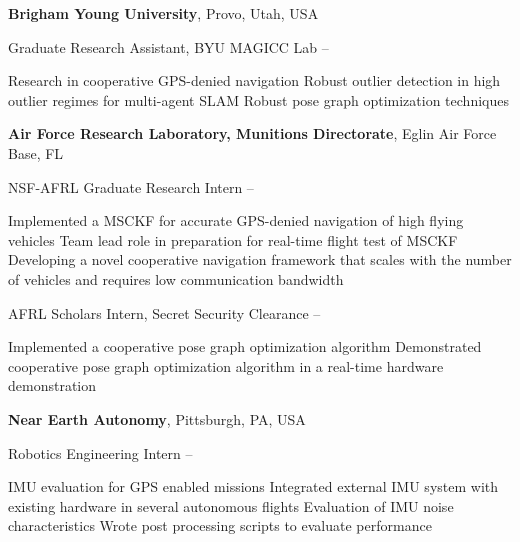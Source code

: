 \documentclass[letterpaper,MMMyyyy,nonstopmode]{simpleresumecv}
\begin{document}
\begin{Body}
\begin{Detail}
\end{Detail}

\Entry
\textbf{Brigham Young University},
Provo, Utah, USA

\Gap
\BulletItem
Graduate Research Assistant, BYU MAGICC Lab
\hfill
{}--
\begin{Detail}
\SubBulletItem
Research in cooperative GPS-denied navigation
\SubBulletItem
Robust outlier detection in high outlier regimes for multi-agent SLAM
\SubBulletItem
Robust pose graph optimization techniques
\end{Detail}

\Entry
\textbf{Air Force Research Laboratory, Munitions Directorate},
Eglin Air Force Base, FL

\Gap
\BulletItem
NSF-AFRL Graduate Research Intern
\hfill
{}--
\begin{Detail}
\SubBulletItem
Implemented a MSCKF for accurate GPS-denied navigation of high flying vehicles
\SubBulletItem
Team lead role in preparation for real-time flight test of MSCKF
\SubBulletItem
Developing a novel cooperative navigation framework that scales with the number of vehicles and requires low communication bandwidth
\end{Detail}

\Gap
\BulletItem
AFRL Scholars Intern, Secret Security Clearance
\hfill
{}--
\begin{Detail}
\SubBulletItem
Implemented a cooperative pose graph optimization algorithm
\SubBulletItem
Demonstrated cooperative pose graph optimization algorithm in a real-time hardware demonstration
\end{Detail}


\Gap
\Entry
\textbf{Near Earth Autonomy},
Pittsburgh, PA, USA

\Gap
\BulletItem
Robotics Engineering Intern
\hfill
{} --
\begin{Detail}
\SubBulletItem
IMU evaluation for GPS enabled missions
\SubBulletItem
Integrated external IMU system with existing hardware in several autonomous flights
\SubBulletItem
Evaluation of IMU noise characteristics
\SubBulletItem
Wrote post processing scripts to evaluate performance
\end{Detail}




\end{Body}
\end{document}

